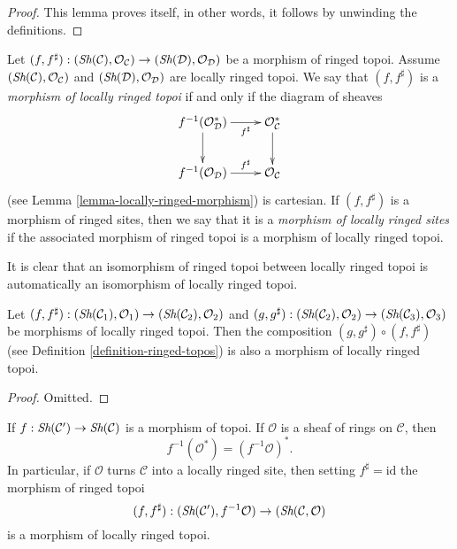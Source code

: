 \begin{proof}
This lemma proves itself, in other words, it follows by unwinding the
definitions.
\end{proof}

\begin{definition}
\label{definition-morphism-locally-ringed-topoi}
Let $(f, f^\sharp) : (\mathop{\textit{Sh}}\nolimits(\mathcal{C}), \mathcal{O}_\mathcal{C})
\to (\mathop{\textit{Sh}}\nolimits(\mathcal{D}), \mathcal{O}_\mathcal{D})$
be a morphism of ringed topoi. Assume
$(\mathop{\textit{Sh}}\nolimits(\mathcal{C}), \mathcal{O}_\mathcal{C})$
and
$(\mathop{\textit{Sh}}\nolimits(\mathcal{D}), \mathcal{O}_\mathcal{D})$
are locally ringed topoi. We say that $(f, f^\sharp)$ is a
{\it morphism of locally ringed topoi} if and only if the
diagram of sheaves
$$
\xymatrix{
f^{-1}(\mathcal{O}^*_\mathcal{D}) \ar[r]_-{f^\sharp} \ar[d] &
\mathcal{O}^*_\mathcal{C} \ar[d] \\
f^{-1}(\mathcal{O}_\mathcal{D}) \ar[r]^-{f^\sharp} &
\mathcal{O}_\mathcal{C}
}
$$
(see
Lemma \ref{lemma-locally-ringed-morphism})
is cartesian. If $(f, f^\sharp)$ is a morphism of ringed sites, then
we say that it is a {\it morphism of locally ringed sites} if
the associated morphism of ringed topoi is a morphism of locally ringed
topoi.
\end{definition}

\noindent
It is clear that an isomorphism of ringed topoi between locally ringed
topoi is automatically an isomorphism of locally ringed topoi.

\begin{lemma}
\label{lemma-composition-morphisms-locally-ringed-topoi}
Let
$(f, f^\sharp) :
(\mathop{\textit{Sh}}\nolimits(\mathcal{C}_1), \mathcal{O}_1)
\to (\mathop{\textit{Sh}}\nolimits(\mathcal{C}_2), \mathcal{O}_2)$ and
$(g, g^\sharp) :
(\mathop{\textit{Sh}}\nolimits(\mathcal{C}_2), \mathcal{O}_2) \to
(\mathop{\textit{Sh}}\nolimits(\mathcal{C}_3), \mathcal{O}_3)$
be morphisms of locally ringed topoi. Then the composition
$(g, g^\sharp) \circ (f, f^\sharp)$ (see
Definition \ref{definition-ringed-topos})
is also a morphism of locally ringed topoi.
\end{lemma}

\begin{proof}
Omitted.
\end{proof}

\begin{lemma}
\label{lemma-locally-ringed-intrinsic-morphism}
If $f : \mathop{\textit{Sh}}\nolimits(\mathcal{C}') \to \mathop{\textit{Sh}}\nolimits(\mathcal{C})$
is a morphism of topoi. If $\mathcal{O}$ is a sheaf of rings
on $\mathcal{C}$, then
$$
f^{-1}(\mathcal{O}^*) = (f^{-1}\mathcal{O})^*.
$$
In particular, if $\mathcal{O}$ turns $\mathcal{C}$ into a locally
ringed site, then setting $f^\sharp = \text{id}$
the morphism of ringed topoi
$$
(f, f^\sharp) :
(\mathop{\textit{Sh}}\nolimits(\mathcal{C}'), f^{-1}\mathcal{O})
\to
(\mathop{\textit{Sh}}\nolimits(\mathcal{C}, \mathcal{O})
$$
is a morphism of locally ringed topoi.
\end{lemma}

